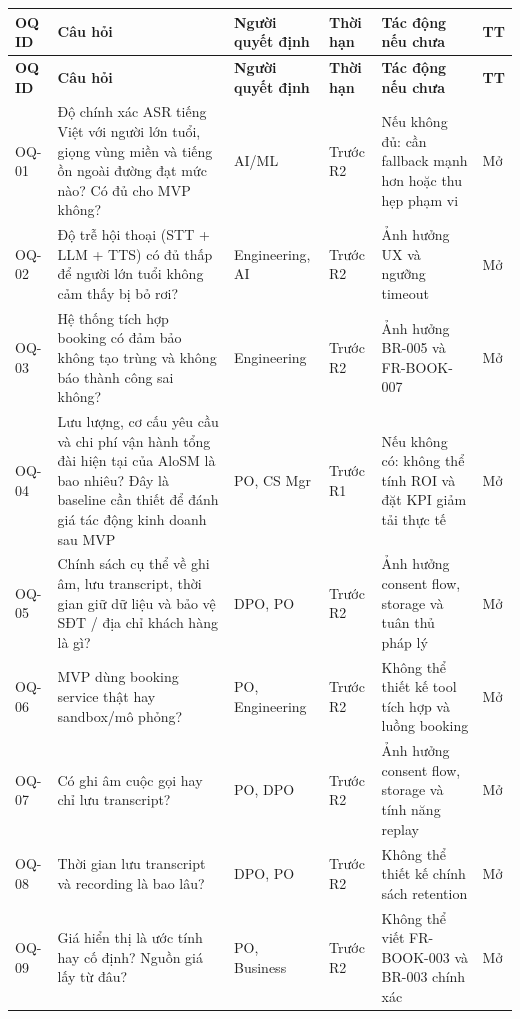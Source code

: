 \documentclass[12pt,a4paper]{article}
\newcommand{\statusopen}{\colorbox{PrioMust}{\small Mở}}
\begin{document}
\begin{longtable}{C{1.2cm} L{4.5cm} L{2.5cm} C{2cm} L{2.5cm} C{1.5cm}}
  \toprule
  \textbf{OQ ID}&\textbf{Câu hỏi}&\textbf{Người quyết định}&\textbf{Thời hạn}&\textbf{Tác động nếu chưa}&\textbf{TT}\\
  \midrule\endfirsthead\toprule{}\textbf{OQ ID}&\textbf{Câu hỏi}&\textbf{Người quyết định}&\textbf{Thời hạn}&\textbf{Tác động nếu chưa}&\textbf{TT}\\\midrule\endhead\bottomrule\endlastfoot
  OQ-01 & Độ chính xác ASR tiếng Việt với người lớn tuổi, giọng vùng miền và tiếng ồn ngoài đường đạt mức nào? Có đủ cho MVP không? & AI/ML & Trước R2 & Nếu không đủ: cần fallback mạnh hơn hoặc thu hẹp phạm vi & \statusopen \\
  OQ-02 & Độ trễ hội thoại (STT + LLM + TTS) có đủ thấp để người lớn tuổi không cảm thấy bị bỏ rơi? & Engineering, AI & Trước R2 & Ảnh hưởng UX và ngưỡng timeout & \statusopen \\
  OQ-03 & Hệ thống tích hợp booking có đảm bảo không tạo trùng và không báo thành công sai không? & Engineering & Trước R2 & Ảnh hưởng BR-005 và FR-BOOK-007 & \statusopen \\
  OQ-04 & Lưu lượng, cơ cấu yêu cầu và chi phí vận hành tổng đài hiện tại của AloSM là bao nhiêu? Đây là baseline cần thiết để đánh giá tác động kinh doanh sau MVP & PO, CS Mgr & Trước R1 & Nếu không có: không thể tính ROI và đặt KPI giảm tải thực tế & \statusopen \\
  OQ-05 & Chính sách cụ thể về ghi âm, lưu transcript, thời gian giữ dữ liệu và bảo vệ SĐT / địa chỉ khách hàng là gì? & DPO, PO & Trước R2 & Ảnh hưởng consent flow, storage và tuân thủ pháp lý & \statusopen \\
  OQ-06 & MVP dùng booking service thật hay sandbox/mô phỏng? & PO, Engineering & Trước R2 & Không thể thiết kế tool tích hợp và luồng booking & \statusopen \\
  OQ-07 & Có ghi âm cuộc gọi hay chỉ lưu transcript? & PO, DPO & Trước R2 & Ảnh hưởng consent flow, storage và tính năng replay & \statusopen \\
  OQ-08 & Thời gian lưu transcript và recording là bao lâu? & DPO, PO & Trước R2 & Không thể thiết kế chính sách retention & \statusopen \\
  OQ-09 & Giá hiển thị là ước tính hay cố định? Nguồn giá lấy từ đâu? & PO, Business & Trước R2 & Không thể viết FR-BOOK-003 và BR-003 chính xác & \statusopen \\

\end{longtable}
\end{document}
